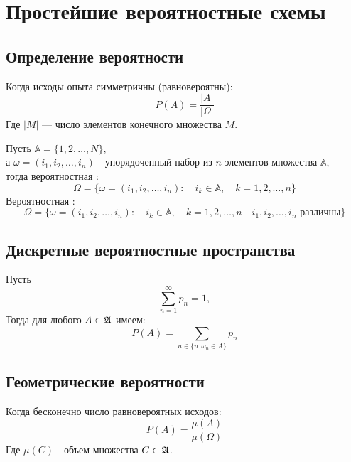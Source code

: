 \section{Простейшие вероятностные схемы}

\subsection{Определение вероятности}
Когда исходы опыта симметричны (равновероятны):
\begin{equation*}
    P(A) = \frac{|A|}{|\Omega|}
\end{equation*}
Где $|M|$ --- число элементов конечного множества $M$.

Пусть $\mathbb{A} = \{1, 2, \ldots, N\}$,\\
а $\omega = (i_1, i_2, \ldots, i_n)$ - упорядоченный набор из $n$ элементов множества $\mathbb{A}$,\\
тогда вероятностная :
\begin{equation*}
    \Omega = \{\omega = (i_1, i_2, \ldots, i_n)\colon \quad i_k \in \mathbb{A}, \quad k = 1, 2, \ldots, n\}
\end{equation*}
Вероятностная :
\begin{equation*}
    \Omega = \{\omega = (i_1, i_2, \ldots, i_n)\colon \quad i_k \in \mathbb{A}, \quad k = 1, 2, \ldots, n
    \quad i_1, i_2, \ldots, i_n \text{ различны}\}
\end{equation*}

\subsection{Дискретные вероятностные пространства}
Пусть
\begin{equation*}
    \sum_{n = 1}^{\infty} p_n = 1,
\end{equation*}
Тогда для любого $A \in \frak{A}$ имеем:
\begin{equation*}
    P(A) = \sum_{n \in \{ n \colon \omega_n \in A \} } p_n
\end{equation*}

\subsection{Геометрические вероятности}
Когда бесконечно число равновероятных исходов:
\begin{equation*}
    P(A) = \frac{\mu(A)}{\mu(\Omega)}
\end{equation*}
Где $\mu(C)$ - объем множества $C \in \frak{A}$.

